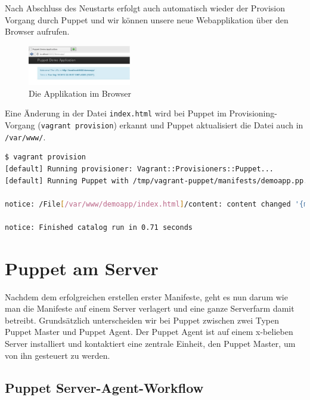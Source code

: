 \documentclass[12pt,a4paper,ngerman]{article}
\begin{document}
Nach Abschluss des Neustarts erfolgt auch automatisch wieder der Provision Vorgang durch Puppet und wir können unsere neue Webapplikation über den Browser aufrufen.
\begin{figure}
  \begin{center}
    \includegraphics[width=0.4\textwidth]{images/demoapp.pdf}
  \end{center}
  \caption{Die Applikation im Browser}
  \label{demoapp}
\end{figure}

Eine Änderung in der Datei \lstinline$index.html$ wird bei Puppet im Provisioning-Vorgang (\lstinline$vagrant provision$) erkannt und Puppet aktualisiert die Datei auch in \lstinline$/var/www/$.
\begin{lstlisting}[language=sh,caption=Puppet Provisioning nach Änderung von index.html, label=provisionapp]
$ vagrant provision
[default] Running provisioner: Vagrant::Provisioners::Puppet...
[default] Running Puppet with /tmp/vagrant-puppet/manifests/demoapp.pp...

notice: /File[/var/www/demoapp/index.html]/content: content changed '{md5}90a8d419b9c7b43b09ba73abebaf8f4c' to '{md5}0a4ee5bb63c3e5c29cc54cf36a4be23c'

notice: Finished catalog run in 0.71 seconds
\end{lstlisting}

\section{Puppet am Server}

Nachdem dem erfolgreichen erstellen erster Manifeste, geht es nun darum wie man die Manifeste auf einem Server verlagert und eine ganze Serverfarm damit betreibt. Grundsätzlich unterscheiden wir bei Puppet zwischen zwei Typen Puppet Master und Puppet Agent. Der Puppet Agent ist auf einem x-belieben Server installiert und kontaktiert eine zentrale Einheit, den Puppet Master, um von ihn gesteuert zu werden. 

\subsection{Puppet Server-Agent-Workflow}
\end{document}

